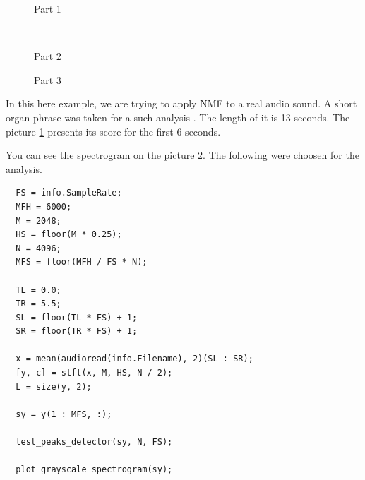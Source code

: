 \documentclass{amsart}
\begin{document}
\bigskip
\bigskip
{}
\bigskip
\bigskip
{}

\begin{titlepage}

\end{titlepage}

\begin{figure}
  \centering
  \centering
  \caption{Part 1}
    \label{F:5-3-p0}
\end{figure}

\begin{figure}
  \centering
  \qquad
  \\
  \centering
  \caption{Part 2}
    \label{F:5-3-p1}
\end{figure}

\begin{figure}
  \centering
  \qquad
  \centering
  \caption{Part 3}
    \label{F:5-3-p2}
\end{figure}

In this here example, we are trying to apply NMF to a real audio sound.
A short organ phrase was taken for a such analysis \cite{L:organ.wav}.
The length of it is 13 seconds. The picture \ref{F:5-3-p0}
presents its score for the first 6 seconds.

You can see the spectrogram on the picture \ref{F:5-3-p1}.
The following were choosen for the analysis.
\begin{verbatim}
  FS = info.SampleRate;
  MFH = 6000;
  M = 2048;
  HS = floor(M * 0.25);
  N = 4096;
  MFS = floor(MFH / FS * N);

  TL = 0.0;
  TR = 5.5;
  SL = floor(TL * FS) + 1;
  SR = floor(TR * FS) + 1;

  x = mean(audioread(info.Filename), 2)(SL : SR);
  [y, c] = stft(x, M, HS, N / 2);
  L = size(y, 2);

  sy = y(1 : MFS, :);

  test_peaks_detector(sy, N, FS);

  plot_grayscale_spectrogram(sy);
\end{verbatim}
\end{document}
